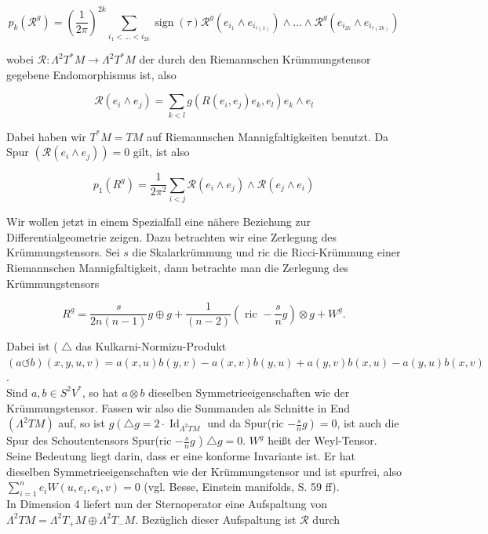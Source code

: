 \documentclass[10pt, letterpaper]{article}
\begin{document}
$$
p_{k}\left(\mathcal{R}^{g}\right)=\left(\frac{1}{2 \pi}\right)^{2 k} \sum_{i_{1}<\ldots<i_{2 k}} \operatorname{sign}(\tau) \mathcal{R}^{g}\left(e_{i_{1}} \wedge e_{i_{\tau(1)}}\right) \wedge \ldots \wedge \mathcal{R}^{g}\left(e_{i_{2 k}} \wedge e_{i_{\tau(2 k)}}\right)
$$

wobei $\mathcal{R}: \Lambda^{2} T^{*} M \rightarrow \Lambda^{2} T^{*} M$ der durch den Riemannschen Krümmungstensor gegebene Endomorphismus ist, also

$$
\mathcal{R}\left(e_{i} \wedge e_{j}\right)=\sum_{k<l} g\left(R\left(e_{i}, e_{j}\right) e_{k}, e_{l}\right) e_{k} \wedge e_{l}
$$

Dabei haben wir $T^{*} M=T M$ auf Riemannschen Mannigfaltigkeiten benutzt. Da Spur $\left(\mathcal{R}\left(e_{i} \wedge e_{j}\right)\right)=0$ gilt, ist also

$$
p_{1}\left(R^{g}\right)=\frac{1}{2 \pi^{2}} \sum_{i<j} \mathcal{R}\left(e_{i} \wedge e_{j}\right) \wedge \mathcal{R}\left(e_{j} \wedge e_{i}\right)
$$

Wir wollen jetzt in einem Spezialfall eine nähere Beziehung zur Differentialgeometrie zeigen. Dazu betrachten wir eine Zerlegung des Krümmungstensors. Sei $s$ die Skalarkrümmung und ric die Ricci-Krümmung einer Riemannschen Mannigfaltigkeit, dann betrachte man die Zerlegung des Krümmungstensors

$$
R^{g}=\frac{s}{2 n(n-1)} g \oplus g+\frac{1}{(n-2)}\left(\text { ric }-\frac{s}{n} g\right) \otimes g+W^{g} .
$$

Dabei ist ( $\triangle$ das Kulkarni-Normizu-Produkt\\
$(a \circlearrowleft b)(x, y, u, v)=a(x, u) b(y, v)-a(x, v) b(y, u)+a(y, v) b(x, u)-a(y, u) b(x, v)$.\\
Sind $a, b \in S^{2} V^{*}$, so hat $a \otimes b$ dieselben Symmetrieeigenschaften wie der Krümmungstensor. Fassen wir also die Summanden als Schnitte in End $\left(\Lambda^{2} T M\right)$ auf, so ist $g\left(\triangle g=2 \cdot \operatorname{Id}_{\Lambda^{2} T M}\right.$ und da Spur(ric $\left.-\frac{s}{n} g\right)=0$, ist auch die Spur des Schoutentensors Spur(ric $-\frac{s}{n} g$ ) $\triangle g=0$. $W^{g}$ heißt der Weyl-Tensor. Seine Bedeutung liegt darin, dass er eine konforme Invariante ist. Er hat dieselben Symmetrieeigenschaften wie der Krümmungstensor und ist spurfrei, also $\sum_{i=1}^{n} e_{i} W\left(u, e_{i}, e_{i}, v\right)=0$ (vgl. Besse, Einstein manifolds, S. 59 ff).\\
In Dimension 4 liefert nun der Sternoperator eine Aufspaltung von $\Lambda^{2} T M= \Lambda^{2} T_{+} M \oplus \Lambda^{2} T_{-} M$. Bezüglich dieser Aufspaltung ist $\mathcal{R}$ durch
\end{document}
